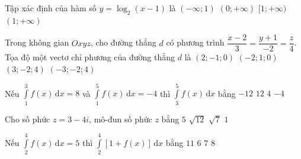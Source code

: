 \begin{ex}%
	Tập xác định của hàm số $y=\log_2(x-1)$ là
	\choice
	{$(-\infty;1)$}
	{$(0;+\infty)$}
	{$[1;+\infty)$}
	{\True $(1;+\infty)$}
\end{ex}

\begin{ex}%
	Trong không gian $Oxyz$, cho đường thẳng $d$ có phương trình $\dfrac{x-2}{3}=\dfrac{y+1}{-2}=\dfrac{z}{4}$. Tọa độ một vectơ chỉ phương của đường thẳng $d$ là
	\choice
	{$(2;-1;0)$}
	{$(-2;1;0)$}
	{\True $(3;-2;4)$}
	{$(-3;-2;4)$}
\end{ex}

\begin{ex}%
	Nếu $\displaystyle\int\limits_1^3{f(x)\mathrm{\,d}x=8}$ và $\displaystyle\int\limits_1^5{f(x)\mathrm{\,d}x=-4}$ thì $\displaystyle\int\limits_3^5{f(x)\mathrm{\,d}x}$ bằng
	\choice
	{\True $-12$}
	{$12$}
	{$4$}
	{$-4$}
\end{ex}

\begin{ex}%
	Cho số phức $z=3-4i$, mô-đun số phức $z$ bằng
	\choice
	{\True $5$}
	{$\sqrt{12}$}
	{$\sqrt{7}$}
	{$1$}
\end{ex}

\begin{ex}%
	Nếu $\displaystyle\int\limits_2^4{f(x)\mathrm{\,d}x=5}$ thì ${\displaystyle\int\limits_2^4{\left[1+f(x)\right]\mathrm{\,d}x}}$ bằng
	\choice
	{$11$}
	{$6$}
	{\True $7$}
	{$8$}
\end{ex}

